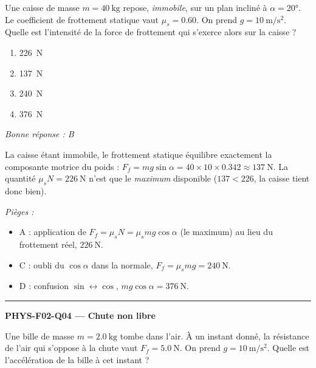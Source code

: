 \documentclass[11pt,a4paper]{article}
\newcommand{\vv}[1]{\vec{#1}}\newcommand{\ds}{\displaystyle}
\begin{document}
Une caisse de masse $m=\qty{40}{\kilogram}$ repose, \emph{immobile}, sur un plan incliné à $\alpha=\ang{20}$. Le coefficient de frottement statique vaut $\mu_s=\num{0.60}$. On prend $g=\qty{10}{\metre\per\second\squared}$. Quelle est l'intensité de la force de frottement qui s'exerce alors sur la caisse ?
\begin{center}
\end{center}
\begin{enumerate}[label=\Alph*)]
\item \qty{226}{\newton}
\item \qty{137}{\newton}
\item \qty{240}{\newton}
\item \qty{376}{\newton}
\end{enumerate}
\textit{Bonne réponse : B}\par
La caisse étant immobile, le frottement statique équilibre exactement la composante motrice du poids : $F_f=mg\sin\alpha=40\times10\times\num{0.342}\approx\qty{137}{\newton}$. La quantité $\mu_s N=\qty{226}{\newton}$ n'est que le \emph{maximum} disponible ($137<226$, la caisse tient donc bien).\par
\textit{Pièges :}
\begin{itemize}
\item A : application de $F_f=\mu_s N=\mu_s mg\cos\alpha$ (le maximum) au lieu du frottement réel, $\qty{226}{\newton}$.
\item C : oubli du $\cos\alpha$ dans la normale, $F_f=\mu_s mg=\qty{240}{\newton}$.
\item D : confusion $\sin\leftrightarrow\cos$, $mg\cos\alpha=\qty{376}{\newton}$.
\end{itemize}
\vspace{8pt}\hrule\vspace{8pt}
\noindent\textbf{PHYS-F02-Q04 --- Chute non libre}\par
Une bille de masse $m=\qty{2.0}{\kilogram}$ tombe dans l'air. À un instant donné, la résistance de l'air qui s'oppose à la chute vaut $F_f=\qty{5.0}{\newton}$. On prend $g=\qty{10}{\metre\per\second\squared}$. Quelle est l'accélération de la bille à cet instant ?
\end{document}
